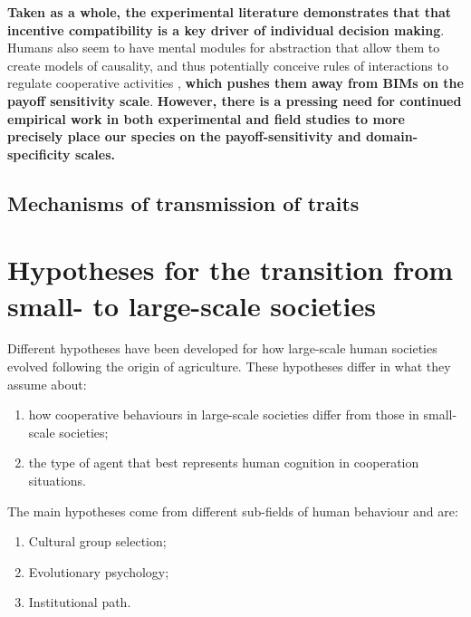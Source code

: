 \documentclass[10pt, a4paper, fleqn]{article}
\begin{document}
\textbf{Taken as a whole, the experimental literature demonstrates that that incentive compatibility is a key driver of individual decision making}. Humans also seem to have mental modules for abstraction that allow them to create models of causality, and thus potentially conceive rules of interactions to regulate cooperative activities \citep{Fukuyama:2011:a}, \textbf{which pushes them away from BIMs on the payoff sensitivity scale}. \textbf{However, there is a pressing need for continued empirical work in both experimental and field studies to more precisely place our species on the payoff-sensitivity and domain-specificity scales.}


\subsection{Mechanisms of transmission of traits}


\section*{Hypotheses for the transition from small- to large-scale societies}
Different hypotheses have been developed for how large-scale human societies evolved following the origin of agriculture. These hypotheses differ in what they assume about:
\begin{enumerate}
    \item how cooperative behaviours in large-scale societies differ from those in small-scale societies;
    \item the type of agent that best represents human cognition in cooperation situations.
\end{enumerate}
The main hypotheses come from different sub-fields of human behaviour and are:
\begin{enumerate}
    \item Cultural group selection;
    \item Evolutionary psychology;
    \item Institutional path.
\end{enumerate}
\end{document}
